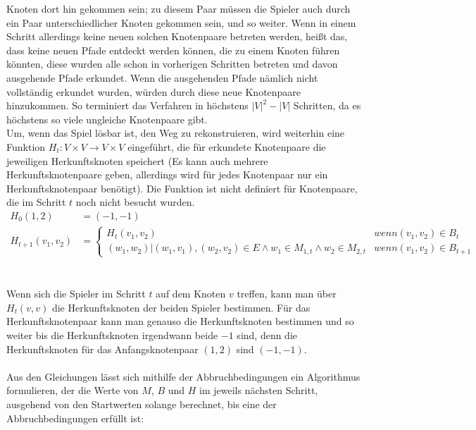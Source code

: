 \documentclass[a4paper,10pt,ngerman]{scrartcl}
\begin{document}
Knoten dort hin gekommen sein; zu diesem Paar müssen die Spieler auch durch ein Paar unterschiedlicher Knoten gekommen sein,
und so weiter. Wenn in einem Schritt allerdings keine neuen solchen Knotenpaare betreten werden, heißt das, dass keine neuen
Pfade entdeckt werden können, die zu einem Knoten führen könnten, diese wurden alle schon in vorherigen Schritten betreten und
davon ausgehende Pfade erkundet. Wenn die ausgehenden Pfade nämlich nicht vollständig erkundet wurden, würden durch diese neue
Knotenpaare hinzukommen. So terminiert das Verfahren in höchstens $|V|^2 - |V|$ Schritten, da es höchstens so viele ungleiche Knotenpaare gibt. \\
Um, wenn das Spiel lösbar ist, den Weg zu rekonstruieren, wird weiterhin eine  Funktion $H_t:V\times V \rightarrow V \times V$ eingeführt,
die für erkundete Knotenpaare die jeweiligen Herkunftsknoten speichert (Es kann auch mehrere Herkunftsknotenpaare geben, allerdings wird für
jedes Knotenpaar nur ein Herkunftsknotenpaar benötigt). Die Funktion ist nicht definiert für Knotenpaare, die im Schritt $t$ noch nicht besucht wurden.
\begin{align*}
  H_0(1,2)         & = (-1, -1)                                                                                                        \\
  H_{t+1}(v_1,v_2) & = \begin{cases}
                         H_{t}(v_1, v_2)                                                                    & wenn (v_1,v_2) \in B_t     \\
                         (w_1, w_2)|(w_1,v_1), (w_2,v_2) \in E \land w_1 \in M_{1,t} \land w_2 \in M_{2, t} & wenn (v_1,v_2) \in B_{t+1}
                       \end{cases}
\end{align*}\\\\
Wenn sich die Spieler im Schritt $t$ auf dem Knoten $v$ treffen, kann man über $H_{t}(v,v)$ die Herkunftsknoten der
beiden Spieler bestimmen. Für das Herkunftsknotenpaar kann man genauso die Herkunftsknoten bestimmen und so weiter
bis die Herkunftsknoten irgendwann beide $-1$ sind, denn die Herkunftsknoten für das Anfangsknotenpaar $(1,2)$ sind $(-1, -1)$.\\\\
Aus den Gleichungen lässt sich mithilfe der Abbruchbedingungen ein Algorithmus formulieren, der die Werte von $M$, $B$
und $H$ im jeweils nächsten Schritt, ausgehend von den Startwerten solange berechnet, bis eine der Abbruchbedingungen erfüllt ist:
\end{document}
